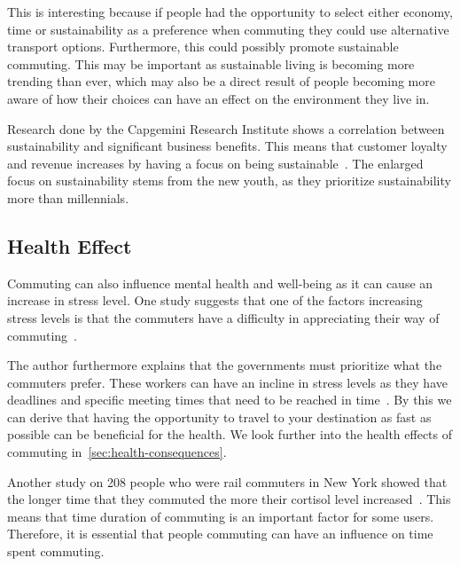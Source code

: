 This is interesting because if people had the opportunity to select either economy, time or sustainability as a
preference when commuting they could use alternative transport options.
Furthermore, this could possibly promote sustainable commuting.
This may be important as sustainable living is becoming more trending than ever, which may also be a direct result of
people becoming more aware of how their choices can have an effect on the environment they live in.

Research done by the Capgemini Research Institute shows a correlation between sustainability and significant business
benefits.
This means that customer loyalty and revenue increases by having a focus on being sustainable~\cite{capgemini2020}.
The enlarged focus on sustainability stems from the new youth, as they prioritize sustainability more than millennials.

\subsection{Health Effect}\label{subsec:health-effect}

Commuting can also influence mental health and well-being as it can cause an increase in stress level.
One study suggests that one of the factors increasing stress levels is that the commuters have a difficulty in
appreciating their way of commuting~\cite{koslowsky2013}.

The author furthermore explains that the governments must prioritize what the commuters prefer.
These workers can have an incline in stress levels as they have deadlines and specific meeting times that need to be
reached in time~\cite{koslowsky2013}.
By this we can derive that having the opportunity to travel to your destination as fast as possible can be beneficial
for the health.
We look further into the health effects of commuting in~\ref{sec:health-consequences}.

Another study on 208 people who were rail commuters in New York showed that the longer time that they commuted the more
their cortisol level increased~\cite{commuting-health2006}.
This means that time duration of commuting is an important factor for some users.
Therefore, it is essential that people commuting can have an influence on time spent commuting.
